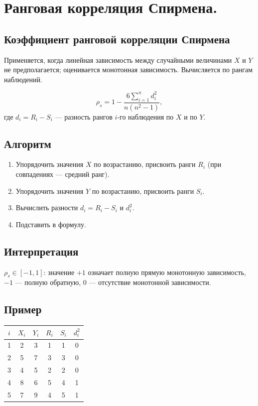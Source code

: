 \section{Ранговая корреляция Спирмена.}

\subsection*{Коэффициент ранговой корреляции Спирмена}

Применяется, когда линейная зависимость между случайными величинами $X$ и $Y$ не предполагается; оценивается монотонная зависимость. Вычисляется по рангам наблюдений.

\[
  \rho_s = 1 - \frac{6\displaystyle\sum_{i=1}^n d_i^2}{n(n^2 - 1)},
\]
где $d_i = R_i - S_i$ — разность рангов $i$-го наблюдения по $X$ и по $Y$.

\subsection*{Алгоритм}

\begin{enumerate}
  \item Упорядочить значения $X$ по возрастанию, присвоить ранги $R_i$ (при совпадениях — средний ранг).
  \item Упорядочить значения $Y$ по возрастанию, присвоить ранги $S_i$.
  \item Вычислить разности $d_i = R_i - S_i$ и $d_i^2$.
  \item Подставить в формулу.
\end{enumerate}

\subsection*{Интерпретация}

$\rho_s \in [-1, 1]$: значение $+1$ означает полную прямую монотонную зависимость, $-1$ — полную обратную, $0$ — отсутствие монотонной зависимости.

\subsection*{Пример}

\begin{center}
\begin{tabular}{cccccc}
  \hline
  $i$ & $X_i$ & $Y_i$ & $R_i$ & $S_i$ & $d_i^2$ \\
  \hline
  1 & 2 & 3 & 1 & 1 & 0 \\
  2 & 5 & 7 & 3 & 3 & 0 \\
  3 & 4 & 5 & 2 & 2 & 0 \\
  4 & 8 & 6 & 5 & 4 & 1 \\
  5 & 7 & 9 & 4 & 5 & 1 \\
  \hline
\end{tabular}
\end{center}

